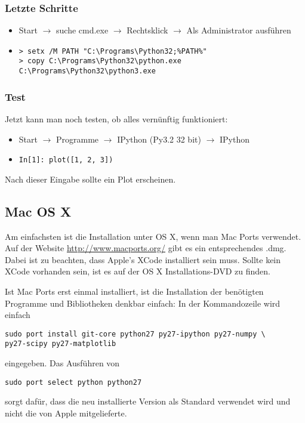 \subsubsection{Letzte Schritte}
\begin{itemize}
  \item Start $\rightarrow$ suche cmd.exe $\rightarrow$ Rechtsklick $\rightarrow$ Als Administrator ausführen
  \item
\begin{verbatim}
> setx /M PATH "C:\Programs\Python32;%PATH%"
> copy C:\Programs\Python32\python.exe C:\Programs\Python32\python3.exe
\end{verbatim}
\end{itemize}

\subsubsection{Test}
Jetzt kann man noch testen, ob alles vernünftig funktioniert:
\begin{itemize}
  \item Start $\rightarrow$ Programme $\rightarrow$ IPython (Py3.2 32 bit) $\rightarrow$ IPython
  \item \texttt{In[1]: plot([1, 2, 3])}
\end{itemize}
Nach dieser Eingabe sollte ein Plot erscheinen.

\subsection{Mac OS X}
Am einfachsten ist die Installation unter OS X, wenn man Mac Ports verwendet.
Auf der Website \url{http://www.macports.org/} gibt es ein entsprechendes .dmg.
Dabei ist zu beachten, dass Apple's XCode installiert sein muss.
Sollte kein XCode vorhanden sein, ist es auf der OS X Installations-DVD zu finden.

Ist Mac Ports erst einmal installiert, ist die Installation der benötigten Programme und Bibliotheken denkbar einfach: In der Kommandozeile wird einfach
\begin{verbatim}
sudo port install git-core python27 py27-ipython py27-numpy \
py27-scipy py27-matplotlib
\end{verbatim}
eingegeben.
Das Ausführen von
\begin{verbatim}
sudo port select python python27
\end{verbatim}
sorgt dafür, dass die neu installierte Version als Standard verwendet wird und nicht die von Apple mitgelieferte.

